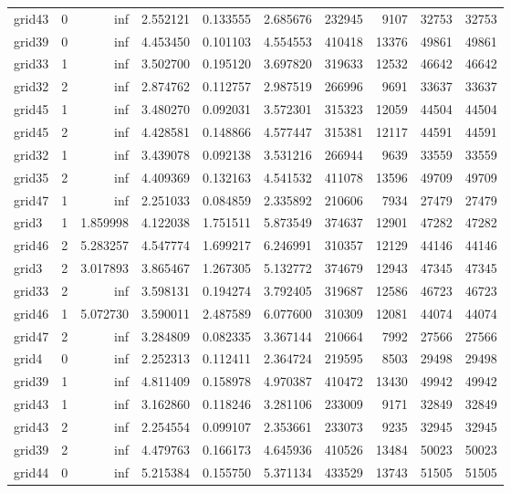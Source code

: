 \begin{longtable}{|l|r|r|r|r|r|r|r|r|r|}
grid43 & 0 & inf & 2.552121 & 0.133555 & 2.685676 & 232945 & 9107 & 32753 & 32753 \\
grid39 & 0 & inf & 4.453450 & 0.101103 & 4.554553 & 410418 & 13376 & 49861 & 49861 \\
grid33 & 1 & inf & 3.502700 & 0.195120 & 3.697820 & 319633 & 12532 & 46642 & 46642 \\
grid32 & 2 & inf & 2.874762 & 0.112757 & 2.987519 & 266996 & 9691 & 33637 & 33637 \\
grid45 & 1 & inf & 3.480270 & 0.092031 & 3.572301 & 315323 & 12059 & 44504 & 44504 \\
grid45 & 2 & inf & 4.428581 & 0.148866 & 4.577447 & 315381 & 12117 & 44591 & 44591 \\
grid32 & 1 & inf & 3.439078 & 0.092138 & 3.531216 & 266944 & 9639 & 33559 & 33559 \\
grid35 & 2 & inf & 4.409369 & 0.132163 & 4.541532 & 411078 & 13596 & 49709 & 49709 \\
grid47 & 1 & inf & 2.251033 & 0.084859 & 2.335892 & 210606 & 7934 & 27479 & 27479 \\
grid3 & 1 & 1.859998 & 4.122038 & 1.751511 & 5.873549 & 374637 & 12901 & 47282 & 47282 \\
grid46 & 2 & 5.283257 & 4.547774 & 1.699217 & 6.246991 & 310357 & 12129 & 44146 & 44146 \\
grid3 & 2 & 3.017893 & 3.865467 & 1.267305 & 5.132772 & 374679 & 12943 & 47345 & 47345 \\
grid33 & 2 & inf & 3.598131 & 0.194274 & 3.792405 & 319687 & 12586 & 46723 & 46723 \\
grid46 & 1 & 5.072730 & 3.590011 & 2.487589 & 6.077600 & 310309 & 12081 & 44074 & 44074 \\
grid47 & 2 & inf & 3.284809 & 0.082335 & 3.367144 & 210664 & 7992 & 27566 & 27566 \\
grid4 & 0 & inf & 2.252313 & 0.112411 & 2.364724 & 219595 & 8503 & 29498 & 29498 \\
grid39 & 1 & inf & 4.811409 & 0.158978 & 4.970387 & 410472 & 13430 & 49942 & 49942 \\
grid43 & 1 & inf & 3.162860 & 0.118246 & 3.281106 & 233009 & 9171 & 32849 & 32849 \\
grid43 & 2 & inf & 2.254554 & 0.099107 & 2.353661 & 233073 & 9235 & 32945 & 32945 \\
grid39 & 2 & inf & 4.479763 & 0.166173 & 4.645936 & 410526 & 13484 & 50023 & 50023 \\
grid44 & 0 & inf & 5.215384 & 0.155750 & 5.371134 & 433529 & 13743 & 51505 & 51505 \\

\end{longtable}
